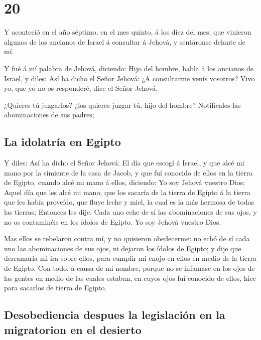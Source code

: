 \hypertarget{section-19}{%
\section{20}\label{section-19}}

 Y aconteció en el año séptimo, en el mes quinto, á los
diez del mes, que vinieron algunos de los ancianos de Israel á consultar
á Jehová, y sentáronse delante de mí.

 Y fué á mí palabra de Jehová, diciendo: 
Hijo del hombre, habla á los ancianos de Israel, y diles: Así ha dicho
el Señor Jehová: ¿A consultarme venís vosotros? Vivo yo, que yo no os
responderé, dice el Señor Jehová.

 ¿Quieres tú juzgarlos? ¿los quieres juzgar tú, hijo del
hombre? Notifícales las abominaciones de sus padres;

\hypertarget{la-idolatruxeda-en-egipto}{%
\subsection{La idolatría en Egipto}\label{la-idolatruxeda-en-egipto}}

 Y diles: Así ha dicho el Señor Jehová: El día que escogí
á Israel, y que alcé mi mano por la simiente de la casa de Jacob, y que
fuí conocido de ellos en la tierra de Egipto, cuando alcé mi mano á
ellos, diciendo: Yo soy Jehová vuestro Dios;  Aquel día
que les alcé mi mano, que los sacaría de la tierra de Egipto á la tierra
que les había proveído, que fluye leche y miel, la cual es la más
hermosa de todas las tierras;  Entonces les dije: Cada uno
eche de sí las abominaciones de sus ojos, y no os contaminéis en los
ídolos de Egipto. Yo soy Jehová vuestro Dios.

 Mas ellos se rebelaron contra mí, y no quisieron
obedecerme: no echó de sí cada uno las abominaciones de sus ojos, ni
dejaron los ídolos de Egipto; y dije que derramaría mi ira sobre ellos,
para cumplir mi enojo en ellos en medio de la tierra de Egipto.
 Con todo, á causa de mi nombre, porque no se infamase en
los ojos de las gentes en medio de las cuales estaban, en cuyos ojos fuí
conocido de ellos, hice para sacarlos de tierra de Egipto.

\hypertarget{desobediencia-despues-la-legislaciuxf3n-en-la-migratorion-en-el-desierto}{%
\subsection{Desobediencia despues la legislación en la migratorion en el
desierto}\label{desobediencia-despues-la-legislaciuxf3n-en-la-migratorion-en-el-desierto}}

